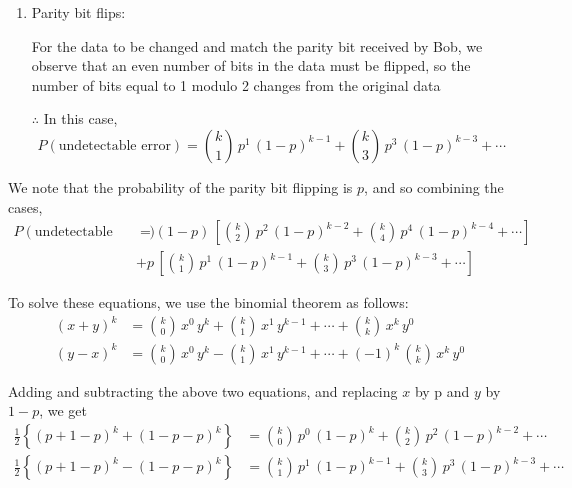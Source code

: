 \documentclass[12pt, oneside]{article}
\begin{document}
\begin{enumerate}
{\begin{enumerate}
{            For the data to be changed and still match the information given by the parity bit,
            we note that an non-zero and even number of bits must be flipped, so the number of
            bits equal to 1 modulo 2 remains the same.

            So, in this case,
            \[
                P(\text{undetectable error}) = {k \choose 2}\,p^2\,(1-p)^{k-2} + {k \choose 4}\,p^4\,(1-p)^{k-4} + \cdots
            \]
        }
        \item {
            Parity bit flips:

            For the data to be changed and match the parity bit received by Bob, we observe that
            an even number of bits in the data must be flipped, so the number of bits equal to 1
            modulo 2 changes from the original data

            \(\therefore\) In this case,
            \[
                P(\text{undetectable error}) = {k \choose 1}\,p^1\,(1-p)^{k-1} + {k \choose 3}\,p^3\,(1-p)^{k-3} + \cdots
            \]
        }
    \end{enumerate}

    We note that the probability of the parity bit flipping is \(p\), and so combining the cases,
    \begin{align}
        P(\text{undetectable error}) &= (1 - p) \,
            \left[{k \choose 2}\,p^2\,(1-p)^{k-2} + {k \choose 4}\,p^4\,(1-p)^{k-4} + \cdots\right] \nonumber \\
            &+ p \,
            \left[{k \choose 1}\,p^1\,(1-p)^{k-1} + {k \choose 3}\,p^3\,(1-p)^{k-3} + \cdots\right]
            \label{eq:1}
    \end{align}

    To solve these equations, we use the binomial theorem as follows:
    \begin{align*}
        (x + y)^k &= {k \choose 0}\,x^0\,y^k + {k \choose 1}\,x^1\,y^{k-1} + \cdots + {k \choose k}\,x^k\,y^0 \\
        (y - x)^k &= {k \choose 0}\,x^0\,y^k - {k \choose 1}\,x^1\,y^{k-1} + \cdots + (-1)^k \, {k \choose k}\,x^k\,y^0 
    \end{align*}

    Adding and subtracting the above two equations, and replacing \(x\) by p and \(y\) by \(1-p\), we get
    \begin{align}
        \frac{1}{2}\left\{(p + 1 - p)^k + (1 - p - p)^k\right\} &= {k \choose 0}\,p^0\,(1-p)^k + {k \choose 2}\,p^2\,(1-p)^{k-2} + \cdots \label{eq:2}\\
        \frac{1}{2}\left\{(p + 1 - p)^k - (1 - p - p)^k\right\} &= {k \choose 1}\,p^1\,(1-p)^{k-1} + {k \choose 3}\,p^3\,(1-p)^{k-3} + \cdots \label{eq:3}
    \end{align}

}
\end{enumerate}
\end{document}
